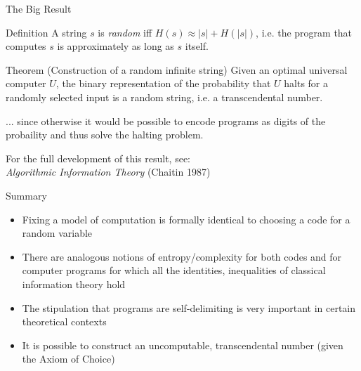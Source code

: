 \documentclass{beamer}
\begin{document}
\begin{frame}{The Big Result}

\begin{structure}{Definition}
 A string $s$ is \emph{random} iff
 $H(s) \approx \vert s \vert + H(\vert s \vert)$,
 i.e. the program that computes $s$ is approximately as long as $s$ itself.
\end{structure}

\bigskip

\begin{structure}{Theorem (Construction of a random infinite string)}
  Given an optimal universal computer $U$, the binary representation of the
  probability that $U$ halts for a randomly selected input is a random
  string, i.e. a transcendental number.
\end{structure}

\bigskip

... since otherwise it would be possible to encode programs as digits of
the probaility and thus solve the halting problem.

\bigskip

For the full development of this result, see:\\
\textit{Algorithmic Information Theory} (Chaitin 1987)



\end{frame}

\begin{frame}{Summary}

 \begin{structure}{}
  \begin{itemize}
   \item{Fixing a model of computation is formally identical to choosing
         a code for a random variable}
   \item{There are analogous notions of entropy/complexity for both codes and
         for computer programs for which all the identities, inequalities of
         classical information theory hold}
   \item{The stipulation that programs are self-delimiting is very important
         in certain theoretical contexts}
   \item{It is possible to construct an uncomputable, transcendental number
         (given the Axiom of Choice)}
  \end{itemize}
 \end{structure}

\end{frame}
\end{document}
